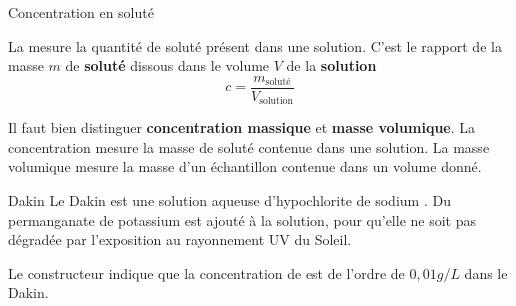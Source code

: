 \begin{doc}{Concentration en soluté}
  \label{doc:concentration}
  \vspace*{-24pt}
  \begin{encart}
    La  mesure la quantité de soluté présent dans une solution.
    C'est le rapport de la masse $m$ de \textbf{soluté} dissous dans le volume $V$ de la \textbf{solution}
    \begin{equation}
      c = \frac{m_\text{soluté}}{V_\text{solution}}
    \end{equation}
  \end{encart}
  
  \attention Il faut bien distinguer \textbf{concentration massique} et \textbf{masse volumique}.
  La concentration mesure la masse de soluté contenue dans une solution.
  La masse volumique mesure la masse d'un échantillon contenue dans un volume donné.
\end{doc}


\newpage
\begin{doc}{Dakin}
  \label{doc:dakin}
  Le Dakin est une solution aqueuse d'hypochlorite de sodium .
  Du permanganate de potassium  est ajouté à la solution, pour qu'elle ne soit pas dégradée par l'exposition au rayonnement UV du Soleil.
  
  \fleche Le constructeur indique que la concentration de  est de l'ordre de $0,\!01 \unit{g/L}$ dans le Dakin.
\end{doc}



